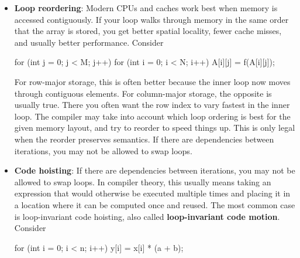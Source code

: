 \documentclass{report}
\begin{document}
\begin{itemize}
                \bigbreak \noindent 
                Modern CPUs and caches work best when memory is accessed contiguously. If your loop walks through memory in the same order that the array is stored, you get better spatial locality, fewer cache misses, and usually better performance.
            \item \textbf{Loop reordering}: Modern CPUs and caches work best when memory is accessed contiguously. If your loop walks through memory in the same order that the array is stored, you get better spatial locality, fewer cache misses, and usually better performance. 
                \bigbreak \noindent 
                Consider
                \bigbreak \noindent 
                \begin{cppcode}
                    for (int j = 0; j < M; j++) {
                        for (int i = 0; i < N; i++) {
                            A[i][j] = f(A[i][j]);
                        }
                    }
                \end{cppcode}
                \bigbreak \noindent 
                For row-major storage, this is often better because the inner loop now moves through contiguous elements.
                \bigbreak \noindent 
                For column-major storage, the opposite is usually true. There you often want the row index to vary fastest in the inner loop.
                \bigbreak \noindent 
                The compiler may take into account which loop ordering is best for the given memory layout, and try to reorder to speed things up. This is only legal when the reorder preserves semantics. If there are dependencies between iterations, you may not be allowed to swap loops.
            \item \textbf{Code hoisting}: If there are dependencies between iterations, you may not be allowed to swap loops.
                \bigbreak \noindent 
                In compiler theory, this usually means taking an expression that would otherwise be executed multiple times and placing it in a location where it can be computed once and reused.
                \bigbreak \noindent 
                The most common case is loop-invariant code hoisting, also called \textbf{loop-invariant code motion}. Consider
                \bigbreak \noindent 
                \begin{cppcode}
                    for (int i = 0; i < n; i++) {
                        y[i] = x[i] * (a + b);
                    }
                \end{cppcode}
                \bigbreak \noindent 

\end{itemize}
\end{document}
